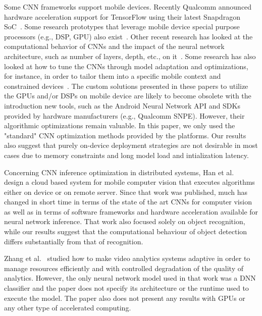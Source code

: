\documentclass[sigconf]{acmart}
\begin{document}
Some CNN frameworks support mobile devices. Recently Qualcomm announced hardware acceleration support for TensorFlow using their latest Snapdragon SoC~\cite{qualcomm}. Some research prototypes that leverage mobile device special purpose processors (e.g., DSP, GPU) also exist~\cite{lane15ubicomp,lane16deepx,lane16mobicase,LatifiOskouei16mm,huynh2017deepmon}.
Other recent research has looked at the computational behavior of CNNs and the impact of the neural network architecture, such as number of layers, depth, etc., on it~\cite{qi17paleo,dong17dnnmark,howard17mobilenets}. Some research has also looked at how to tune the CNNs through model adaptation and optimizations, for instance, in order to tailor them into a specific mobile context and constrained devices~\cite{li16deepcham,han16mobisys,bhattacharya16sensys,huynh2017deepmon}. The custom solutions presented in these papers to utilize  the GPUs and/or DSPs on mobile device are likely to become obsolete with the introduction new tools, such as the Android Neural Network API and SDKs provided by hardware manufacturers (e.g., Qualcomm SNPE). However, their algorithmic optimizations remain valuable. In this paper, we only used the "standard" CNN optimization methods provided by the platforms. Our results also suggest that purely on-device deployment strategies are not desirable in most cases due to memory constraints and long model load and intialization latency.

Concerning CNN inference optimization in distributed systems, Han et al.~\cite{han16mobisys} design a cloud based system for mobile computer vision that executes algorithms either on device or on remote server. Since that work was published, much has changed in short time in terms of the state of the art CNNs for computer vision as well as in terms of software frameworks and hardware acceleration available for neural network inference. That work also focused solely on object recognition, while our results suggest that the computational behaviour of object detection differs substantially from that of recognition.

Zhang et al.~\cite{zhang17nsdi} studied how to make video analytics systems adaptive in order to manage resources efficiently and with controlled degradation of the quality of analytics. However, the only neural network model used in that work was a DNN classifier and the paper does not specify its architecture or the runtime used to execute the model. The paper also does not present any results with GPUs or any other type of accelerated computing.
\end{document}
